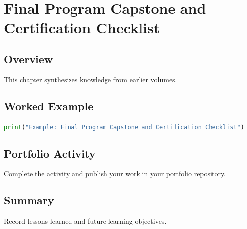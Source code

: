 \chapter{Final Program Capstone and Certification Checklist}
\label{chap:vol15-5}



\section{Overview}
This chapter synthesizes knowledge from earlier volumes.

\section{Worked Example}
\begin{lstlisting}[language=Python]
print("Example: Final Program Capstone and Certification Checklist")
\end{lstlisting}

\section{Portfolio Activity}
Complete the activity and publish your work in your portfolio repository.

\section{Summary}
Record lessons learned and future learning objectives.
